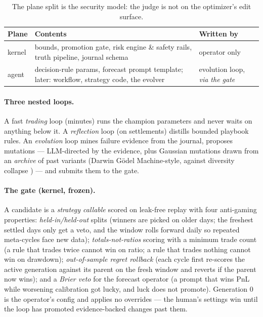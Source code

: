 \documentclass[10pt,twocolumn]{article}
\begin{document}
\begin{table}[t]
\centering
\small
\begin{tabular}{@{}p{1.4cm}p{4.2cm}p{1.7cm}@{}}
\toprule
\textbf{Plane} & \textbf{Contents} & \textbf{Written by} \\
\midrule
kernel & bounds, promotion gate, risk engine \& safety rails, truth pipeline, journal schema & operator only \\
agent & decision-rule params, forecast prompt template; later: workflow, strategy code, the evolver & evolution loop, \emph{via the gate} \\
\bottomrule
\end{tabular}
\caption{The plane split is the security model: the judge is not on the
optimizer's edit surface.}
\label{tab:planes}
\end{table}

\paragraph{Three nested loops.} A fast \emph{trading} loop (minutes) runs the
champion parameters and never waits on anything below it. A \emph{reflection}
loop (on settlements) distills bounded playbook rules. An \emph{evolution} loop
mines failure evidence from the journal, proposes mutations --- LLM-directed by
the evidence, plus Gaussian mutations drawn from an \emph{archive} of past
variants (Darwin Gödel Machine-style, against diversity collapse
\cite{dgm}) --- and submits them to the gate.

\paragraph{The gate (kernel, frozen).} A candidate is a \emph{strategy callable}
scored on leak-free replay with four anti-gaming properties:
\emph{held-in/held-out} splits (winners are picked on older days; the freshest
settled days only get a veto, and the window rolls forward daily so repeated
meta-cycles face new data); \emph{totals-not-ratios} scoring with a minimum trade
count (a rule that trades twice cannot win on ratio; a rule that trades nothing
cannot win on drawdown); \emph{out-of-sample regret rollback} (each cycle first
re-scores the active generation against its parent on the fresh window and
reverts if the parent now wins); and a \emph{Brier veto} for the forecast
operator (a prompt that wins PnL while worsening calibration got lucky, and luck
does not promote). Generation 0 is the operator's config and applies no
overrides --- the human's settings win until the loop has promoted
evidence-backed changes past them.
\end{document}
